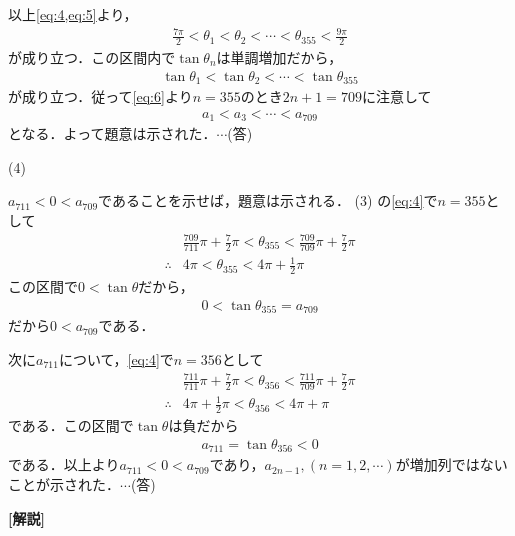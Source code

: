 \documentclass[a4paper,10pt]{ltjsarticle}
\begin{document}
\begin{multicols}{2}
  以上\cref{eq:4,eq:5}より，
  \begin{align*}
    \frac{7\pi}{2} < \theta_1 < \theta_2 < \cdots < \theta_{355} < \frac{9\pi}{2}
  \end{align*}
  が成り立つ．この区間内で$\tan\theta_n$は単調増加だから，
  \begin{align*}
    \tan \theta_1 < \tan \theta_2 < \cdots < \tan \theta_{355}
  \end{align*}
  が成り立つ．従って\cref{eq:6}より$n=355$のとき$2n+1=709$に注意して
  \begin{align*}
    a_1 < a_3 < \cdots < a_{709}
  \end{align*}
  となる．よって題意は示された．$\cdots$(答)

  \vspace{10pt}
  (4)

  $a_{711}<0<a_{709}$であることを示せば，題意は示される．
  (3) の\cref{eq:4}で$n=355$として
  \begin{align*}
     & \frac{709}{711}\pi + \frac{7}{2}\pi < \theta_{355} < \frac{709}{709}\pi + \frac{7}{2}\pi \\
    \therefore
     & 4\pi < \theta_{355} < 4\pi + \frac{1}{2}\pi
  \end{align*}
  この区間で$0<\tan\theta$だから，
  \begin{align*}
    0 < \tan\theta_{355} = a_{709}
  \end{align*}
  だから$0<a_{709}$である．

  次に$a_{711}$について，\cref{eq:4}で$n=356$として
  \begin{align*}
     & \frac{711}{711}\pi + \frac{7}{2}\pi < \theta_{356} < \frac{711}{709}\pi + \frac{7}{2}\pi \\
    \therefore
     & 4\pi + \frac{1}{2}\pi < \theta_{356} < 4\pi + \pi
  \end{align*}
  である．この区間で$\tan\theta$は負だから
  \begin{align*}
    a_{711} = \tan\theta_{356} < 0
  \end{align*}
  である．以上より$a_{711}<0<a_{709}$であり，$a_{2n-1}, (n=1,2,\cdots)$が増加列ではないことが示された．$\cdots$(答)

  \vspace{10pt}
  {\bf[解説]}

  \newpage
\end{multicols}
\end{document}
